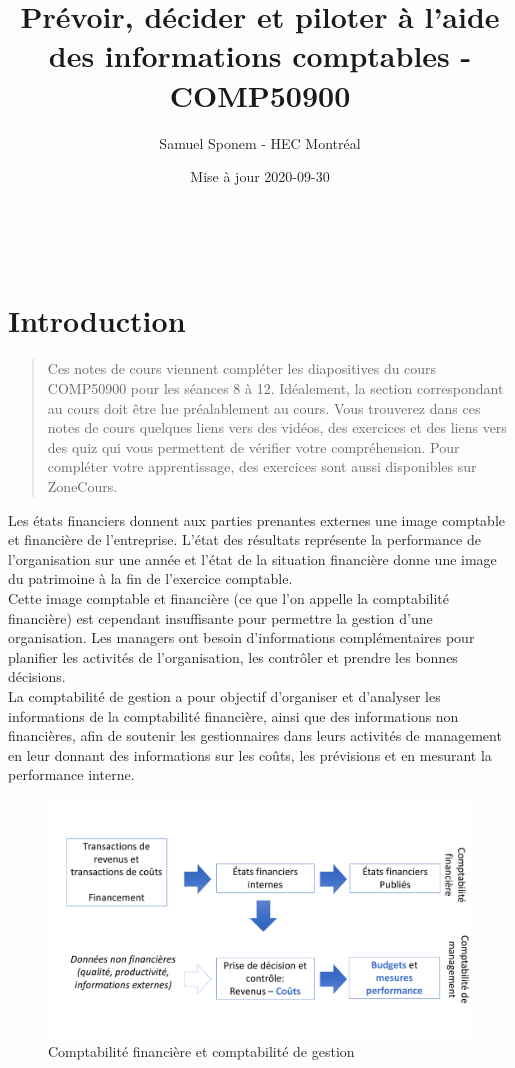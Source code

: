 \documentclass{tufte-handout}
\author{Samuel Sponem - HEC Montréal}
\date{Mise à jour 2020-09-30}
\title{Prévoir, décider et piloter à l'aide des informations comptables - COMP50900}
\begin{document}
\maketitle
\tableofcontents

\clearpage\\
\section{Introduction}
\label{sec:org260925d}
\begin{quote}
Ces notes de cours viennent compléter les diapositives du cours COMP50900 pour les séances 8 à 12. Idéalement, la section correspondant au cours doit être lue préalablement au cours. Vous trouverez dans ces notes de cours quelques liens vers des vidéos, des exercices et des liens vers des quiz qui vous permettent de vérifier votre compréhension. Pour compléter votre apprentissage, des exercices sont aussi disponibles sur ZoneCours.\\
\end{quote}


Les états financiers donnent aux parties prenantes externes une image comptable et financière de l'entreprise. L'état des résultats représente la performance de l'organisation sur une année et l'état de la situation financière donne une image du patrimoine à la fin de l'exercice comptable.\\

Cette image comptable et financière (ce que l'on appelle la comptabilité financière) est cependant insuffisante pour permettre la gestion d'une organisation. Les managers ont besoin d'informations complémentaires pour planifier les activités de l'organisation, les contrôler et prendre les bonnes décisions.\\

La comptabilité de gestion a pour objectif d'organiser et d'analyser les informations de la comptabilité financière, ainsi que des informations non financières, afin de soutenir les gestionnaires dans leurs activités de management en leur donnant des informations sur les coûts, les prévisions et en mesurant la performance interne.\\

\begin{figure}[htbp]
\centering
\includegraphics[width=.9\linewidth]{./img/comptafi.pdf}
\caption{\label{fig:orgad4ef43}Comptabilité financière et comptabilité de gestion}
\end{figure}
\end{document}
